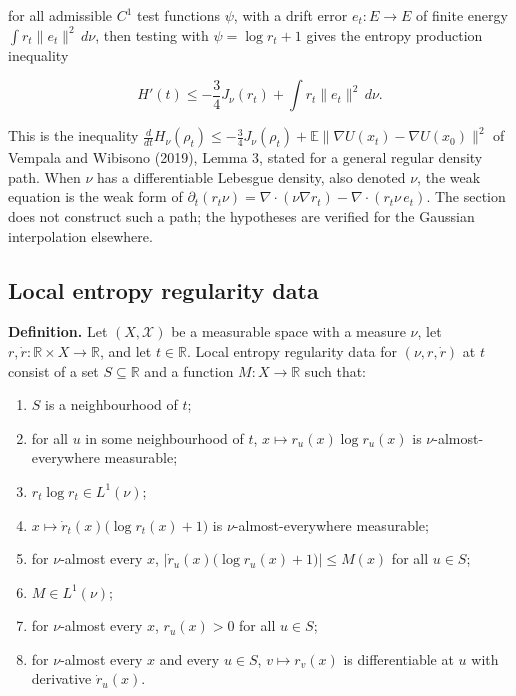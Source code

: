 \documentclass[11pt,a4paper]{report}
\begin{document}
for all admissible \(C^1\) test functions \(\psi\), with a drift error \(e_t:E\to E\) of finite energy \(\int r_t\|e_t\|^2\,d\nu\), then testing with \(\psi=\log r_t+1\) gives the entropy production inequality


\[H'(t)\le-\frac34J_\nu(r_t)+\int r_t\|e_t\|^2\,d\nu.\]


This is the inequality \(\frac{d}{dt}H_\nu(\rho_t)\le-\frac34J_\nu(\rho_t)+\mathbb E\|\nabla U(x_t)-\nabla U(x_0)\|^2\) of Vempala and Wibisono (2019), Lemma 3, stated for a general regular density path. When \(\nu\) has a differentiable Lebesgue density, also denoted \(\nu\), the weak equation is the weak form of \(\partial_t(r_t\nu)=\nabla\cdot(\nu\nabla r_t)-\nabla\cdot(r_t\nu\,e_t)\). The section does not construct such a path; the hypotheses are verified for the Gaussian interpolation elsewhere.

\subsection{\texorpdfstring{Local entropy regularity data}{Local entropy regularity data}}
\label{report-step-UnadjustedLangevin-LSI-Regularity-lean-1}


\textbf{Definition.} Let \((X,\mathcal X)\) be a measurable space with a measure \(\nu\), let \(r,\dot r:\mathbb R\times X\to\mathbb R\), and let \(t\in\mathbb R\). Local entropy regularity data for \((\nu,r,\dot r)\) at \(t\) consist of a set \(S\subseteq\mathbb R\) and a function \(M:X\to\mathbb R\) such that:



\begin{enumerate}


\item \(S\) is a neighbourhood of \(t\);

\item for all \(u\) in some neighbourhood of \(t\), \(x\mapsto r_u(x)\log r_u(x)\) is \(\nu\)-almost-everywhere measurable;

\item \(r_t\log r_t\in L^1(\nu)\);

\item \(x\mapsto\dot r_t(x)\bigl(\log r_t(x)+1\bigr)\) is \(\nu\)-almost-everywhere measurable;

\item for \(\nu\)-almost every \(x\), \(\bigl|\dot r_u(x)\bigl(\log r_u(x)+1\bigr)\bigr|\le M(x)\) for all \(u\in S\);

\item \(M\in L^1(\nu)\);

\item for \(\nu\)-almost every \(x\), \(r_u(x)>0\) for all \(u\in S\);

\item for \(\nu\)-almost every \(x\) and every \(u\in S\), \(v\mapsto r_v(x)\) is differentiable at \(u\) with derivative \(\dot r_u(x)\).

\end{enumerate}
\end{document}

